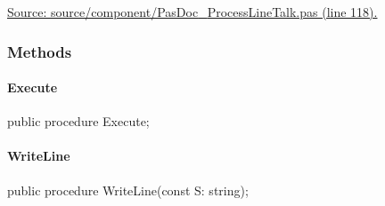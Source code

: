 \documentclass{report}
\newif\ifpdf
\begin{document}
\begin{list}{}
\begin{flushleft}
\ifpdf
\end{flushleft}
\fi


\par  \par
\href{https://github.com/pasdoc/pasdoc/blob/master/source/component/PasDoc_ProcessLineTalk.pas#L118}{Source: source/component/PasDoc{\_}ProcessLineTalk.pas (line 118).}\end{list}
\subsubsection*{\large{\textbf{Methods}}\normalsize\hspace{1ex}\hfill}
\paragraph*{Execute}\hspace*{\fill}

\label{PasDoc_ProcessLineTalk.TProcessLineTalk-Execute}
\begin{list}{}{
\setlength{\itemindent}{0cm}
\setlength{\listparindent}{0cm}
\setlength{\leftmargin}{\evensidemargin}
\addtolength{\leftmargin}{\tmplength}
\settowidth{\labelsep}{X}
\addtolength{\leftmargin}{\labelsep}
\setlength{\labelwidth}{\tmplength}
}
\item[\textbf{Declaration}\hfill]
\ifpdf
\begin{flushleft}
\fi
\begin{ttfamily}
public procedure Execute;\end{ttfamily}

\ifpdf
\end{flushleft}
\fi

\end{list}
\paragraph*{WriteLine}\hspace*{\fill}

\label{PasDoc_ProcessLineTalk.TProcessLineTalk-WriteLine}
\begin{list}{}{
\setlength{\itemindent}{0cm}
\setlength{\listparindent}{0cm}
\setlength{\leftmargin}{\evensidemargin}
\addtolength{\leftmargin}{\tmplength}
\settowidth{\labelsep}{X}
\addtolength{\leftmargin}{\labelsep}
\setlength{\labelwidth}{\tmplength}
}
\item[\textbf{Declaration}\hfill]
\ifpdf
\begin{flushleft}
\fi
\begin{ttfamily}
public procedure WriteLine(const S: string);\end{ttfamily}

\ifpdf
\end{flushleft}
\fi

\end{list}
\end{document}
